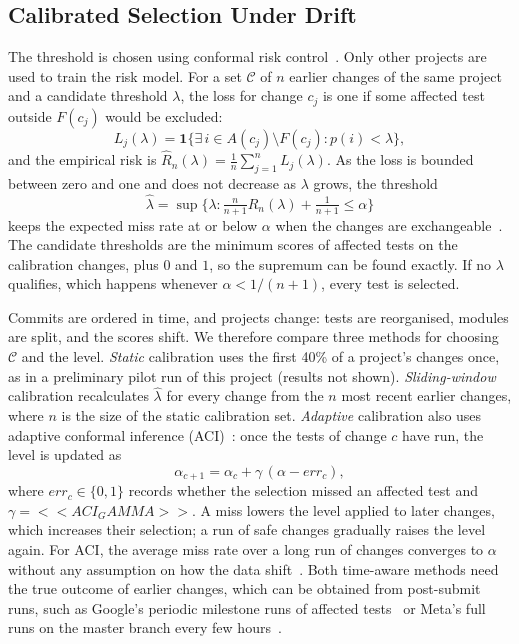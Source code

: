 \documentclass[conference]{IEEEtran}
\begin{document}
\subsection{Calibrated Selection Under Drift}\label{sec:crc}
The threshold is chosen using conformal risk control~\cite{angelopoulos2024crc}. Only other projects are used to train the risk model. For a set $\mathcal{C}$ of $n$ earlier changes of the same project and a candidate threshold $\lambda$, the loss for change $c_j$ is one if some affected test outside $F(c_j)$ would be excluded:
\begin{equation}
L_j(\lambda) = \mathbf{1}\big\{\exists\, i \in A(c_j)\setminus F(c_j) : p(i) < \lambda\big\}, \label{eq:loss}
\end{equation}
and the empirical risk is $\hat R_n(\lambda) = \tfrac{1}{n}\sum_{j=1}^{n} L_j(\lambda)$. As the loss is bounded between zero and one and does not decrease as $\lambda$ grows, the threshold
\begin{equation}
\hat\lambda = \sup\Big\{\lambda : \tfrac{n}{n+1}\hat R_n(\lambda) + \tfrac{1}{n+1} \le \alpha\Big\} \label{eq:crc}
\end{equation}
keeps the expected miss rate at or below $\alpha$ when the changes are exchangeable~\cite{angelopoulos2024crc}. The candidate thresholds are the minimum scores of affected tests on the calibration changes, plus $0$ and $1$, so the supremum can be found exactly. If no $\lambda$ qualifies, which happens whenever $\alpha < 1/(n+1)$, every test is selected.

Commits are ordered in time, and projects change: tests are reorganised, modules are split, and the scores shift. We therefore compare three methods for choosing $\mathcal{C}$ and the level. \emph{Static} calibration uses the first 40\% of a project's changes once, as in a preliminary pilot run of this project (results not shown). \emph{Sliding-window} calibration recalculates $\hat\lambda$ for every change from the $n$ most recent earlier changes, where $n$ is the size of the static calibration set. \emph{Adaptive} calibration also uses adaptive conformal inference (ACI)~\cite{gibbs2021aci}: once the tests of change $c$ have run, the level is updated as
\begin{equation}
\alpha_{c+1} = \alpha_c + \gamma\,(\alpha - \mathit{err}_c), \label{eq:aci}
\end{equation}
where $\mathit{err}_c\in\{0,1\}$ records whether the selection missed an affected test and $\gamma=<<ACI_GAMMA>>$. A miss lowers the level applied to later changes, which increases their selection; a run of safe changes gradually raises the level again. For ACI, the average miss rate over a long run of changes converges to $\alpha$ without any assumption on how the data shift~\cite{gibbs2021aci}. Both time-aware methods need the true outcome of earlier changes, which can be obtained from post-submit runs, such as Google's periodic milestone runs of affected tests~\cite{memon2017taming} or Meta's full runs on the master branch every few hours~\cite{machalica2019pts}.
\end{document}
